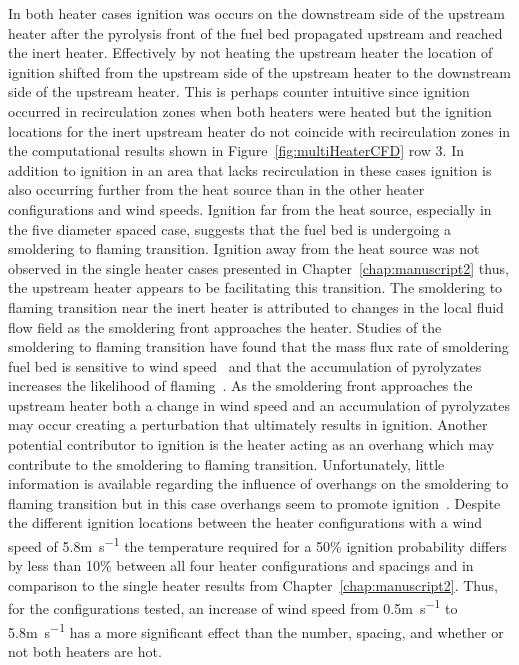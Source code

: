     In both heater cases ignition was occurs on the downstream side of the upstream heater after the pyrolysis front of the fuel bed propagated upstream and reached the inert heater. Effectively by not heating the upstream heater the location of ignition shifted from the upstream side of the upstream heater to the downstream side of the upstream heater. This is perhaps counter intuitive since ignition occurred in recirculation zones when both heaters were heated but the ignition locations for the inert upstream heater do not coincide with recirculation zones in the computational results shown in Figure~\ref{fig:multiHeaterCFD} row 3. In addition to ignition in an area that lacks recirculation in these cases ignition is also occurring further from the heat source than in the other heater configurations and wind speeds. Ignition far from the heat source, especially in the five diameter spaced case, suggests that the fuel bed is undergoing a smoldering to flaming transition. Ignition away from the heat source was not observed in the single heater cases presented in Chapter~\ref{chap:manuscript2} thus, the upstream heater appears to be facilitating this transition. The smoldering to flaming transition near the inert heater is attributed to changes in the local fluid flow field as the smoldering front approaches the heater. Studies of the smoldering to flaming transition have found that the mass flux rate of smoldering fuel bed is sensitive to wind speed~\cite{Ohlemiller1990} and that the accumulation of pyrolyzates increases the likelihood of flaming~\cite{Stoliarov2018AnAssemblies}. As the smoldering front approaches the upstream heater both a change in wind speed and an accumulation of pyrolyzates may occur creating a perturbation that ultimately results in ignition. Another potential contributor to ignition is the heater acting as an overhang which may contribute to the smoldering to flaming transition. Unfortunately, little information is available regarding the influence of overhangs on the smoldering to flaming transition but in this case overhangs seem to promote ignition~\cite{Santoso2019}. Despite the different ignition locations between the heater configurations with a wind speed of 5.8\si{\meter\per\second} the temperature required for a 50\% ignition probability differs by less than 10\% between all four heater configurations and spacings and in comparison to the single heater results from Chapter~\ref{chap:manuscript2}. Thus, for the configurations tested, an increase of wind speed from 0.5\si{\meter\per\second} to 5.8\si{\meter\per\second} has a more significant effect than the number, spacing, and whether or not both heaters are hot.
    
